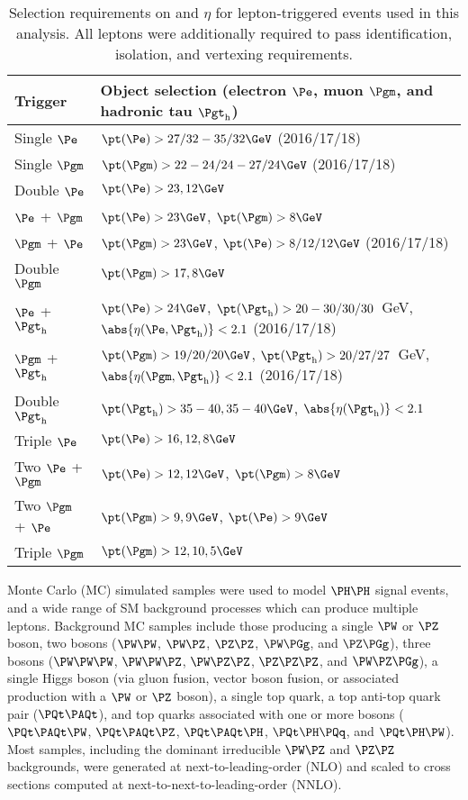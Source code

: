 \begin{table}[!h]
\begin{center}
\begin{tabular}{|l|l|}

\hline
Trigger            & Object selection (electron $\Pe$, muon $\Pgm$, and hadronic tau $\tauh$) \\
\hline
Single $\Pe$       & $\pt(\Pe) > 27 / 32 - 35 / 32\GeV$ (2016/17/18) \\
Single $\Pgm$      & $\pt(\Pgm) > 22 - 24 / 24 - 27 / 24\GeV$ (2016/17/18) \\ 
Double $\Pe$       & $\pt(\Pe) > 23, 12\GeV$ \\
$\Pe$ + $\Pgm$     & $\pt(\Pe) > 23\GeV$, $\pt(\Pgm) > 8\GeV$ \\
$\Pgm$ + $\Pe$     & $\pt(\Pgm) > 23\GeV$, $\pt(\Pe) > 8 / 12 / 12\GeV$ (2016/17/18) \\
Double $\Pgm$      & $\pt(\Pgm) > 17, 8\GeV$ \\
$\Pe$ + $\tauh$    & $\pt(\Pe) > 24\GeV$, $\pt(\tauh) > 20 - 30 / 30 / 30$~GeV, $\abs{\eta(\Pe, \tauh)} < 2.1$ (2016/17/18) \\
$\Pgm$ + $\tauh$   & $\pt(\Pgm) > 19 / 20 / 20\GeV$, $\pt(\tauh) > 20 / 27 / 27$~GeV, $\abs{\eta(\Pgm, \tauh)} < 2.1$ (2016/17/18) \\
Double $\tauh$     & $\pt(\tauh) > 35 - 40, 35 - 40\GeV$, $\abs{\eta(\tauh)} < 2.1$  \\
Triple $\Pe$       & $\pt(\Pe) > 16, 12, 8\GeV$ \\
Two $\Pe$ + $\Pgm$ & $\pt(\Pe) > 12, 12\GeV$, $\pt(\Pgm) > 8\GeV$ \\
Two $\Pgm$ + $\Pe$ & $\pt(\Pgm) > 9, 9\GeV$, $\pt(\Pe) > 9\GeV$ \\
Triple $\Pgm$      & $\pt(\Pgm) > 12, 10, 5\GeV$ \\
\hline

\end{tabular}
\end{center}
\caption{
  Selection requirements on \pt and $\eta$ for lepton-triggered events used in this analysis.  All
  leptons were additionally required to pass identification, isolation, and vertexing requirements.
}
\label{tab:triggers}
\end{table}


Monte Carlo (MC) simulated samples were used to model $\HH$ signal events, and a wide range
of SM background processes which can produce multiple leptons.  Background MC samples
include those producing a single $\PW$ or $\PZ$ boson, two bosons ($\PW\PW$, $\PW\PZ$, $\PZ\PZ$, $\PW\Pgg$, and $\PZ\Pgg$),
three bosons ($\PW\PW\PW$, $\PW\PW\PZ$, $\PW\PZ\PZ$, $\PZ\PZ\PZ$, and $\PW\PZ\Pgg$), a single Higgs boson (via gluon fusion,
vector boson fusion, or associated production with a $\PW$ or $\PZ$ boson), a single top quark,
a top anti-top quark pair ($\ttbar$), and top quarks associated with one or more bosons ($\ttW$,
$\ttZ$, $\ttH$, $\tHq$, and $\tHW$).  Most samples, including the dominant irreducible $\PW\PZ$ and $\PZ\PZ$
backgrounds, were generated at next-to-leading-order (NLO) and scaled to cross sections
computed at next-to-next-to-leading-order (NNLO).

